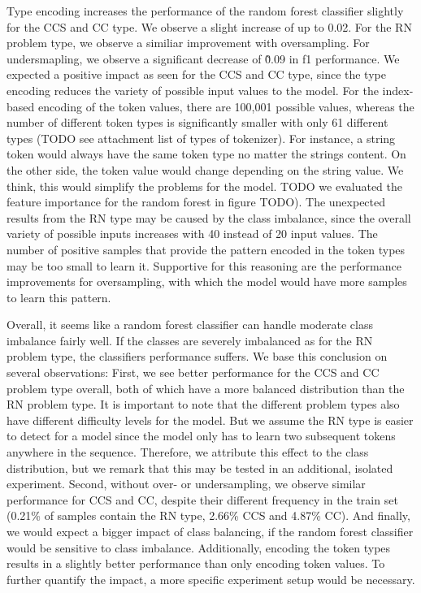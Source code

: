 Type encoding increases the performance of the random forest classifier slightly for the CCS and CC type. We observe a slight increase of up to 0.02. For the RN problem type, we observe a similiar improvement with oversampling. For undersmapling, we observe a significant decrease of \~0.09 in f1 performance. 
We expected a positive impact as seen for the CCS and CC type, since the type encoding reduces the variety of possible input values to the model. For the index-based encoding of the token values, there are 100,001 possible values, whereas the number of different token types is significantly smaller with only 61 different types (TODO see attachment list of types of tokenizer). For instance, a string token would always have the same token type no matter the strings content. On the other side, the token value would change depending on the string value. We think, this would simplify the problems for the model. TODO we evaluated the feature importance for the random forest in figure TODO).
The unexpected results from the RN type may be caused by the class imbalance, since the overall variety of possible inputs increases with 40 instead of 20 input values. The number of positive samples that provide the pattern encoded in the token types may be too small to learn it. Supportive for this reasoning are the performance improvements for oversampling, with which the model would have more samples to learn this pattern.


Overall, it seems like a random forest classifier can handle moderate class imbalance fairly well. If the classes are severely imbalanced as for the RN problem type, the classifiers performance suffers.
We base this conclusion on several observations: First, we see better performance for the CCS and CC problem type overall, both of which have a more balanced distribution than the RN problem type. It is important to note that the different problem types also have different difficulty levels for the model. But we assume the RN type is easier to detect for a model since the model only has to learn two subsequent tokens anywhere in the sequence. Therefore, we attribute this effect to the class distribution, but we remark that this may be tested in an additional, isolated experiment. 
Second, without over- or undersampling, we observe similar performance for CCS and CC, despite their different frequency in the train set (0.21\% of samples contain the RN type, 2.66\% CCS and 4.87\% CC). 
And finally, we would expect a bigger impact of class balancing, if the random forest classifier would be sensitive to class imbalance.
Additionally, encoding the token types results in a slightly better performance than only encoding token values. To further quantify the impact, a more specific experiment setup would be necessary.


